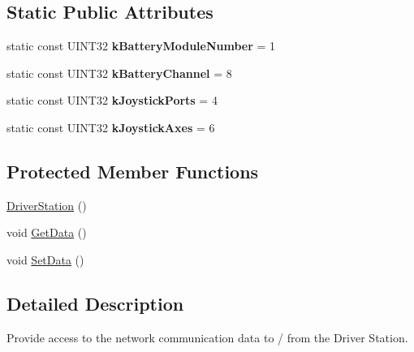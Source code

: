 \subsection*{Static Public Attributes}
\begin{DoxyCompactItemize}
\item 
\hypertarget{classDriverStation_a6dca6901009c8a08f120742bc1434c6c}{
static const UINT32 {\bfseries kBatteryModuleNumber} = 1}
\label{classDriverStation_a6dca6901009c8a08f120742bc1434c6c}

\item 
\hypertarget{classDriverStation_a9af68ea44c22fff029ef61bd7fefba38}{
static const UINT32 {\bfseries kBatteryChannel} = 8}
\label{classDriverStation_a9af68ea44c22fff029ef61bd7fefba38}

\item 
\hypertarget{classDriverStation_a02a022d3efcbcd3d7e11b9ec7341f742}{
static const UINT32 {\bfseries kJoystickPorts} = 4}
\label{classDriverStation_a02a022d3efcbcd3d7e11b9ec7341f742}

\item 
\hypertarget{classDriverStation_a41b68f0f2844dbaf02e90e59139062ab}{
static const UINT32 {\bfseries kJoystickAxes} = 6}
\label{classDriverStation_a41b68f0f2844dbaf02e90e59139062ab}

\end{DoxyCompactItemize}
\subsection*{Protected Member Functions}
\begin{DoxyCompactItemize}
\item 
\hyperlink{classDriverStation_a343945cc9bbf870e0ada94b47f3fec92}{DriverStation} ()
\item 
void \hyperlink{classDriverStation_a0e394acf2476d1bbfc831c9e5fbd9b41}{GetData} ()
\item 
void \hyperlink{classDriverStation_a01eb31617213308c3688a5e863c53449}{SetData} ()
\end{DoxyCompactItemize}


\subsection{Detailed Description}
Provide access to the network communication data to / from the Driver Station. 

